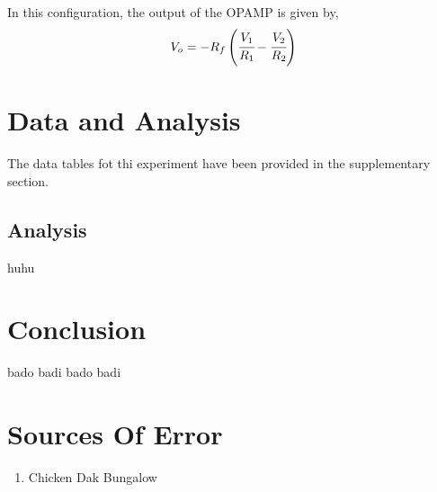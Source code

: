 \documentclass[10pt]{scrartcl}
\theoremstyle{definition}
\begin{document}
In this configuration, the output of the OPAMP is given by, 
$$V_o = -R_f\left(\cfrac{V_1}{R_1} - \cfrac{V_2}{R_2}\right)$$

\section{Data and Analysis}
The data tables fot thi experiment have been provided in the supplementary section.
\subsection{Analysis}
huhu
\section{Conclusion}
bado badi bado badi
\section{Sources Of Error}
\begin{enumerate}
    \item Chicken Dak Bungalow
    
\end{enumerate}
\end{document}
